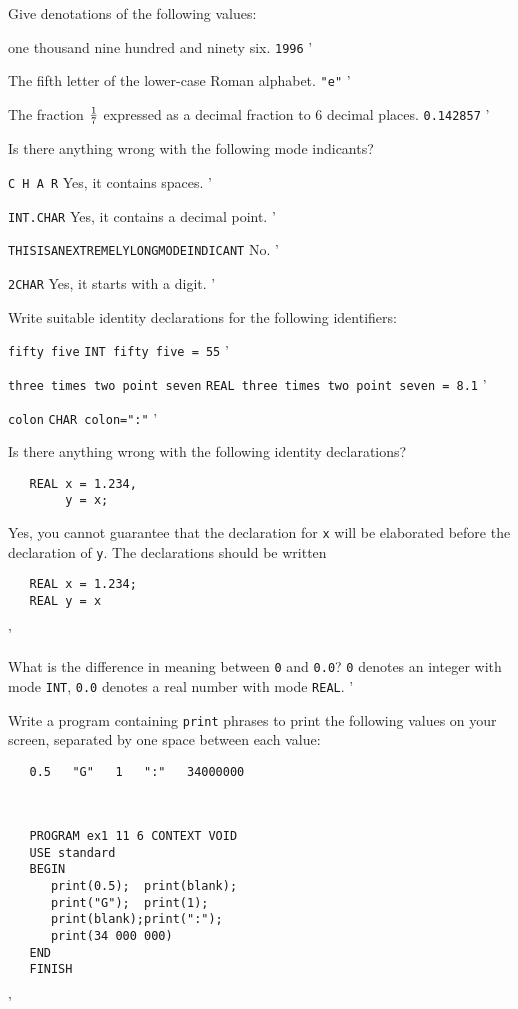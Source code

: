 \begin{exercise}
\item Give denotations of the following values:
\begin{subex}
\item one thousand nine hundred and ninety six. \subans \verb|1996|
'
\item The fifth letter of the lower-case Roman alphabet.
\subans \verb|"e"|
'
\item The fraction $1\over7$ expressed as a decimal fraction to 6
decimal places. \subans \verb|0.142857|
'
\end{subex}
\item Is there anything wrong with the following mode indicants?
\begin{subex}
\item \verb|C H A R| \subans Yes, it contains spaces.
'
\item \verb|INT.CHAR| \subans Yes, it contains a decimal point.
'
\item \verb|THISISANEXTREMELYLONGMODEINDICANT| \subans No.
'
\item \verb|2CHAR| \subans Yes, it starts with a digit.
'
\end{subex}
\item Write suitable identity declarations for the following
identifiers:
\begin{subex}
\item \verb|fifty five| \subans \verb|INT fifty five = 55|
'
\item \verb|three times two point seven|
\subans \verb|REAL three times two point seven = 8.1|
'
\item \verb|colon| \subans \verb|CHAR colon=":"|
'
\end{subex}
\item Is there anything wrong with the following identity declarations?
\begin{verbatim}
   REAL x = 1.234,
        y = x;
\end{verbatim}
\indent\ans Yes, you cannot guarantee that the declaration for
\verb|x| will be elaborated before the declaration of \verb|y|. The
declarations should be written
\begin{verbatim}
   REAL x = 1.234;
   REAL y = x
\end{verbatim}
'
\item What is the difference in meaning between \verb|0| and
\verb|0.0|?  \ans \verb|0| denotes an integer with mode \verb|INT|,
\verb|0.0| denotes a real number with mode \verb|REAL|.
'
\item Write a program containing \verb|print| phrases to print the
following values on your screen, separated by one space between each
value:
\begin{verbatim}
   0.5   "G"   1   ":"   34000000
\end{verbatim}
\indent\ans \ %
\begin{verbatim}
   PROGRAM ex1 11 6 CONTEXT VOID
   USE standard
   BEGIN
      print(0.5);  print(blank);
      print("G");  print(1);
      print(blank);print(":");
      print(34 000 000)
   END
   FINISH
\end{verbatim}
'
\end{exercise}
